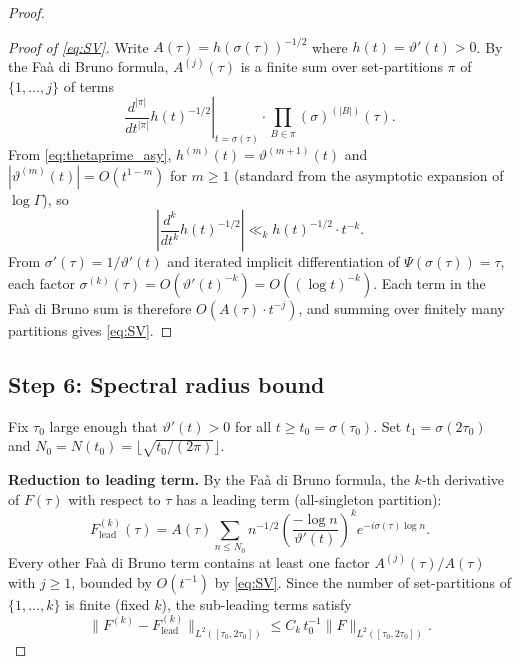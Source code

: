 \documentclass[11pt]{article}
\theoremstyle{definition}
\begin{document}
\begin{proof}
\begin{proof}[Proof of \eqref{eq:SV}]
Write $A(\tau)=h(\sigma(\tau))^{-1/2}$ where $h(t)=\vartheta'(t)>0$.
By the Fa\`a di Bruno formula, $A^{(j)}(\tau)$ is a finite sum over
set-partitions $\pi$ of $\{1,\ldots,j\}$ of terms
\[
\left.\frac{d^{|\pi|}}{dt^{|\pi|}}h(t)^{-1/2}\right|_{t=\sigma(\tau)}
\cdot\prod_{B\in\pi}(\sigma)^{(|B|)}(\tau).
\]
From \eqref{eq:thetaprime_asy}, $h^{(m)}(t)=\vartheta^{(m+1)}(t)$
and $|\vartheta^{(m)}(t)|=O(t^{1-m})$ for $m\ge 1$
(standard from the asymptotic expansion of $\log\Gamma$), so
\[
\left|\frac{d^k}{dt^k}h(t)^{-1/2}\right|
\ll_k h(t)^{-1/2}\cdot t^{-k}.
\]
From $\sigma'(\tau)=1/\vartheta'(t)$ and iterated implicit
differentiation of $\Psi(\sigma(\tau))=\tau$, each factor
$\sigma^{(k)}(\tau)=O(\vartheta'(t)^{-k})=O((\log t)^{-k})$.
Each term in the Fa\`a di Bruno sum is therefore
$O(A(\tau)\cdot t^{-j})$, and summing over finitely many partitions
gives \eqref{eq:SV}.
\end{proof}

\subsection*{Step 6: Spectral radius bound}

Fix $\tau_0$ large enough that $\vartheta'(t)>0$ for all
$t\ge t_0=\sigma(\tau_0)$.  Set $t_1=\sigma(2\tau_0)$ and
$N_0=N(t_0)=\lfloor\sqrt{t_0/(2\pi)}\rfloor$.

\textbf{Reduction to leading term.}
By the Fa\`a di Bruno formula, the $k$-th derivative of $F(\tau)$
with respect to $\tau$ has a leading term (all-singleton partition):
\begin{equation}\label{eq:Flead}
F^{(k)}_{\mathrm{lead}}(\tau)
=A(\tau)\sum_{n\le N_0}n^{-1/2}
\left(\frac{-\log n}{\vartheta'(t)}\right)^k
e^{-i\sigma(\tau)\log n}.
\end{equation}
Every other Fa\`a di Bruno term contains at least one factor
$A^{(j)}(\tau)/A(\tau)$ with $j\ge 1$, bounded by $O(t^{-1})$ by
\eqref{eq:SV}.  Since the number of set-partitions of $\{1,\ldots,k\}$
is finite (fixed $k$), the sub-leading terms satisfy
\begin{equation}\label{eq:subleading}
\bigl\|F^{(k)}-F^{(k)}_{\mathrm{lead}}\bigr\|_{L^2([\tau_0,2\tau_0])}
\le C_k\,t_0^{-1}\|F\|_{L^2([\tau_0,2\tau_0])}.
\end{equation}


\end{proof}
\end{document}
